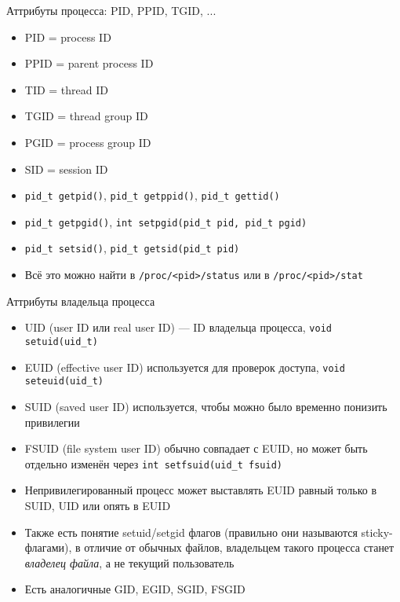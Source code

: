 \documentclass[10pt,pdf,hyperref={unicode}]{beamer}
\begin{document}
\begin{frame}{Аттрибуты процесса: PID, PPID, TGID, ...}
\begin{itemize}
    \item PID = process ID
    \item PPID = parent process ID
    \item TID = thread ID
    \item TGID = thread group ID
    \item PGID = process group ID
    \item SID = session ID
    \item \texttt{pid_t getpid()}, \texttt{pid_t getppid()}, \texttt{pid_t gettid()}
    \item \texttt{pid_t getpgid()}, \texttt{int setpgid(pid_t pid, pid_t pgid)}
    \item \texttt{pid_t setsid()}, \texttt{pid_t getsid(pid_t pid)}
    \item Всё это можно найти в \texttt{/proc/<pid>/status} или в \texttt{/proc/<pid>/stat}
\end{itemize}
\end{frame}

\begin{frame}{Аттрибуты владельца процесса}
\begin{itemize}
    \item UID (user ID или real user ID) — ID владельца процесса, \texttt{void setuid(uid_t)}
    \item EUID (effective user ID) используется для проверок доступа, \texttt{void seteuid(uid_t)}
    \item SUID (saved user ID) используется, чтобы можно было временно понизить привилегии
    \item FSUID (file system user ID) обычно совпадает с EUID, но может быть отдельно изменён через \texttt{int setfsuid(uid_t fsuid)}
    \item Непривилегированный процесс может выставлять EUID равный только в SUID, UID или опять в EUID
    \item Также есть понятие setuid/setgid флагов (правильно они называются sticky-флагами), в отличие от обычных файлов, владельцем такого процесса станет \emph{владелец файла}, а не текущий пользователь
    \item Есть аналогичные GID, EGID, SGID, FSGID
\end{itemize}
\end{frame}
\end{document}

